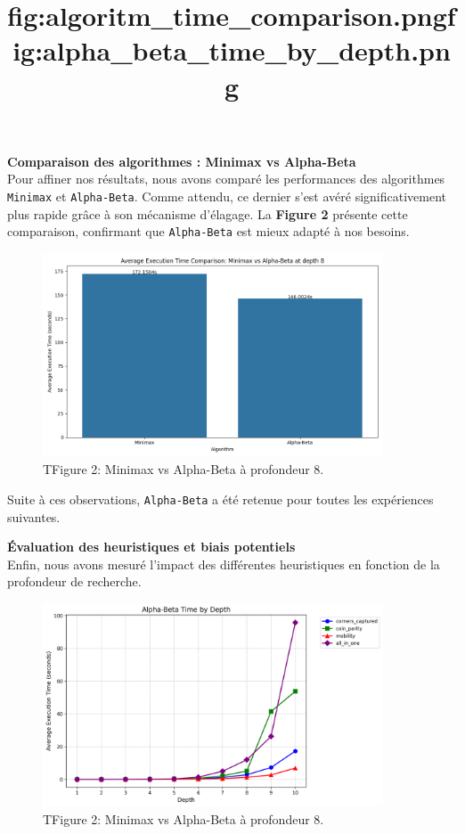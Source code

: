\documentclass[a4paper,12pt]{article}
\begin{document}
\newpage

\textbf{Comparaison des algorithmes : Minimax vs Alpha-Beta}\\

Pour affiner nos résultats, nous avons comparé les performances des algorithmes
\texttt{Minimax} et \texttt{Alpha-Beta}. Comme attendu, ce dernier s’est avéré
significativement plus rapide grâce à son mécanisme d’élagage. La
\textbf{Figure 2} présente cette comparaison, confirmant que
\texttt{Alpha-Beta} est mieux adapté à nos besoins.\\

\begin{figure}[h]
    \centering
    \includegraphics[width=0.9\textwidth]{images/algorithm_time_comparison.png}
    \caption{TFigure 2: Minimax vs Alpha-Beta à profondeur 8.}
    \title{fig:algoritm_time_comparison.png}
\end{figure}

\noindent Suite à ces observations, \texttt{Alpha-Beta} a été retenue pour toutes
les expériences suivantes.\\

\newpage

\textbf{Évaluation des heuristiques et biais potentiels}\\

Enfin, nous avons mesuré l’impact des différentes heuristiques en fonction de
la profondeur de recherche.

\begin{figure}[h]
    \centering
    \includegraphics[width=0.9\textwidth]{images/alpha_beta_time_by_depth.png}
    \caption{TFigure 2: Minimax vs Alpha-Beta à profondeur 8.}
    \title{fig:alpha_beta_time_by_depth.png}
\end{figure}
\end{document}
